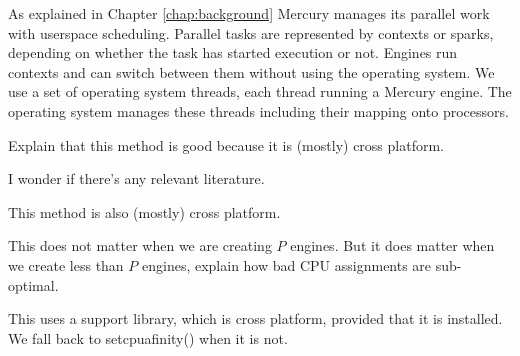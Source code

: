 

As explained in Chapter \ref{chap:background} Mercury manages its parallel
work with userspace scheduling.
Parallel tasks are represented by contexts or sparks,
depending on whether the task has started execution or not.
Engines run contexts and can switch between them without using the operating
system.
We use a set of operating system threads,
each thread running a Mercury engine.
The operating system manages these threads including their mapping onto
processors.



Explain that this method is good because it is (mostly) cross platform.

I wonder if there's any relevant literature.

This method is also (mostly) cross platform.

This does not matter when we are creating $P$ engines.
But it does matter when we create less than $P$ engines,
explain how bad CPU assignments are sub-optimal.

This uses a support library, which is cross platform, provided that it is installed.
We fall back to setcpuafinity() when it is not.


